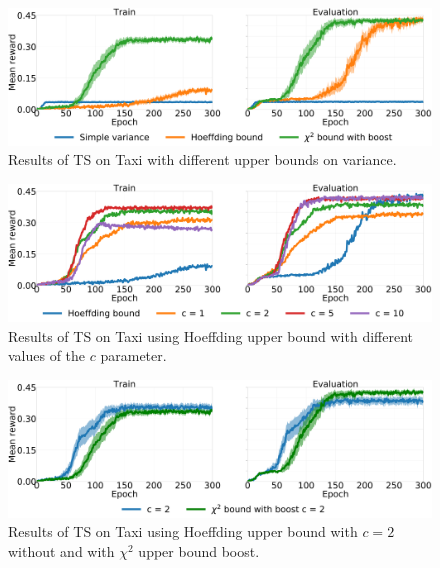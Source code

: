 \begin{figure}[t]
\begin{minipage}{\textwidth}
\begin{center}
  \includegraphics[scale=.05]{img/bounds.pdf}
\end{center}
\end{minipage}
\caption{Results of TS on Taxi with different upper bounds on variance.}\label{F:bounds}
\end{figure}
\begin{figure}[t]
\begin{minipage}{\textwidth}
\begin{center}
  \includegraphics[scale=.05]{img/cs.pdf}
\end{center}
\end{minipage}
\caption{Results of TS on Taxi using Hoeffding upper bound with different values of the $c$ parameter.}\label{F:cs}
\end{figure}
\begin{figure}[t]
\begin{minipage}{\textwidth}
\begin{center}
  \includegraphics[scale=.05]{img/chics.pdf}
\end{center}
\end{minipage}
\caption{Results of TS on Taxi using Hoeffding upper bound with $c=2$ without and with $\chi^2$ upper bound boost.}\label{F:chics}
\end{figure}

